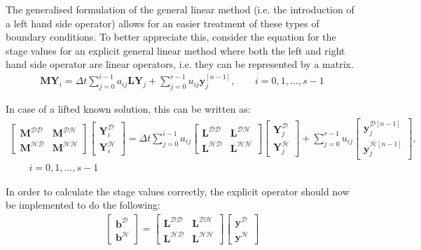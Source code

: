 The generalised formulation of the general linear method (i.e. the introduction
of a left hand side operator) allows for an easier treatment of these types of
boundary conditions. To better appreciate this, consider the equation for the
stage values for an explicit general linear method where both the left and right
hand side operator are linear operators, i.e. they can be represented by a
matrix.
\begin{align*}
\boldsymbol{M}\boldsymbol{Y}_i = \Delta
t\sum_{j=0}^{i-1}a_{ij}\boldsymbol{L}\boldsymbol{Y}_j+\sum_{j=0}^{r-1}u_{ij}\boldsymbol{y}_{j}^{[n-1]},
\qquad i=0,1,\ldots,s-1
\end{align*}

In case of a lifted known solution, this can be written as:
\begin{align*}
\left[ \begin{array}{cc}
\boldsymbol{M}^{\mathcal{DD}} & \boldsymbol{M}^{\mathcal{DH}} \\
\boldsymbol{M}^{\mathcal{HD}} & \boldsymbol{M}^{\mathcal{HH}} \end{array} \right]
\left[ \begin{array}{c}
\boldsymbol{Y}^{\mathcal{D}}_i \\
\boldsymbol{Y}^{\mathcal{H}}_i \end{array} \right]
= \Delta t\sum_{j=0}^{i-1}a_{ij}
\left[ \begin{array}{cc}
\boldsymbol{L}^{\mathcal{DD}} & \boldsymbol{L}^{\mathcal{DH}} \\
\boldsymbol{L}^{\mathcal{HD}} & \boldsymbol{L}^{\mathcal{HH}} \end{array} \right]
\left[ \begin{array}{c}
\boldsymbol{Y}^{\mathcal{D}}_j \\
\boldsymbol{Y}^{\mathcal{H}}_j \end{array} \right]
+\sum_{j=0}^{r-1}u_{ij}
\left[ \begin{array}{c}
\boldsymbol{y}^{\mathcal{D}[n-1]}_j \\
\boldsymbol{y}^{\mathcal{H}[n-1]}_j \end{array} \right],\\
\qquad i=0,1,\ldots,s-1
\end{align*}
 
In order to calculate the stage values correctly, the explicit operator
should now be implemented to do the following:
\begin{align*}
\left[ \begin{array}{c}
\boldsymbol{b}^{\mathcal{D}} \\
\boldsymbol{b}^{\mathcal{H}} \end{array} \right]
=
\left[ \begin{array}{cc}
\boldsymbol{L}^{\mathcal{DD}} & \boldsymbol{L}^{\mathcal{DH}} \\
\boldsymbol{L}^{\mathcal{HD}} & \boldsymbol{L}^{\mathcal{HH}} \end{array} \right]
\left[ \begin{array}{c}
\boldsymbol{y}^{\mathcal{D}} \\
\boldsymbol{y}^{\mathcal{H}} \end{array} \right]
\end{align*}
    
